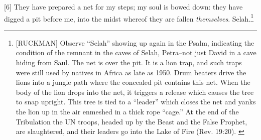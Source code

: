 [6] \textcolor[rgb]{0.00,0.00,1.00}{They have prepared a net for my steps; my soul is bowed down: they have digged a pit before me, into the midst whereof they are fallen \emph{themselves}. Selah.}\footnote{[RUCKMAN] Observe “Selah” showing up again in the Psalm, indicating the condition of the remnant in the caves of Selah, Petra--not just David in a cave hiding from Saul. The net is over the pit. It is a lion trap, and such traps were still used by natives in Africa as late as 1950. Drum beaters drive the lions into a jungle path where the concealed pit contains this net. When the body of the lion drops into the net, it triggers a release which causes the tree to snap upright. This tree is tied to a “leader” which closes the net and yanks the lion up in the air enmeshed in a thick rope “cage.” At the end of the Tribulation the UN troops, headed up by the Beast and the False Prophet, are slaughtered, and their leaders go into the Lake of Fire (Rev. 19:20). \cite{Ruckman1992Psalms} }
